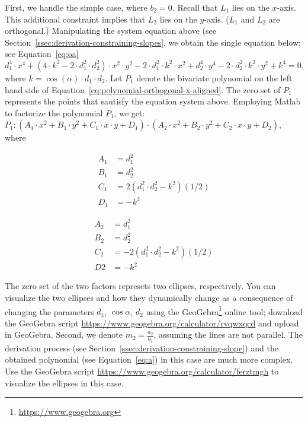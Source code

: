 First, we handle the simple case, where $b_2 = 0$. Recall that $L_1$ lies on the $x$-axis. This additional constraint implies that $L_2$ lies on the $y$-axis. ($L_1$ and $L_2$ are orthogonal.) Manipulating the system equation above (see Section~\ref{ssec:derivation-constraining-slopes}, we obtain the single equation below; see Equation~\ref{eq:oa}
\begin{equation}
  d_1^4\cdot x^4 + (4\cdot k^2 - 2\cdot d_1^2\cdot d_2^2)\cdot x^2\cdot y^2 - 2\cdot d_1^2\cdot k^2\cdot x^2 + d_2^4\cdot y^4 - 2\cdot d_2^2\cdot k^2\cdot y^2 + k^4 = 0\label{eq:polynomial-orthogonal-x-aligned},
\end{equation}
where $k = \cos(\alpha)\cdot d_1\cdot d_2$. Let $P_1$ denote the bivariate polynomial on the left hand side of Equation~\ref{eq:polynomial-orthogonal-x-aligned}. The zero set of $P_1$ represents the points that sautisfy the equation system above. Employing Matlab to factorize the polynomial $P_1$, we get: $P_1: (A_1\cdot x^2 + B_1\cdot y^2 + C_1\cdot x\cdot y + D_1)\cdot (A_2\cdot x^2 + B_2\cdot y^2 + C_2\cdot x\cdot y +D_2)$, where
\begin{minipage}[c]{0.5\linewidth}
\begin{align*}
  A_1 &= d_1^2\\
  B_1 &= d_2^2\\
  C_1 &= 2(d_1^2\cdot d_2^2 - k^2)(1/2)\\
  D_1 &= -k^2
\end{align*}
\end{minipage}
\begin{minipage}[c]{0.5\linewidth}
\begin{align*}
  A_2 &= d_1^2\\
  B_2 &= d_2^2\\
  C_2 &= -2(d_1^2\cdot d_2^2 - k^2)(1/2)\\
  D2 &= -k^2
\end{align*}
\end{minipage}
The zero set of the two factors represets two ellipses, respectively.
You can visualize the two ellipses and how they dynamically change as
a consequence of changing the parameters $d_1$, $\cos{\alpha}$, $d_2$
using the GeoGebra\footnote{\url{https://www.geogebra.org}} online
tool; download the GeoGebra script
\url{https://www.geogebra.org/calculator/rvqwxqcd} and upload in
GeoGebra. Second, we denote $m_2 = \frac{a_2}{b_2}$, assuming the
lines are not parallel. The derivation process (see
Section~\ref{ssec:derivation-constraining-slope}) and the obtained
polynomial (see Equation~\ref{eq:a}) in this case are
much more complex. Use the GeoGebra script
\url{https://www.geogebra.org/calculator/ferztmgh} to visualize the
ellipses in this case.
